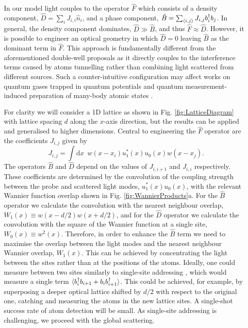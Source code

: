 In our model light couples to the operator $\hat{F}$ which consists of
a density component, $\hat{D} = \sum_i J_{i,i} \hat{n}_i$, and a phase
component, $\hat{B} = \sum_{\langle i, j \rangle} J_{i,j} b^\dagger_i
b_j$. In general, the density component dominates,
$\hat{D} \gg \hat{B}$, and thus $\hat{F} \approx \hat{D}$.  However,
it is possible to engineer an optical geometry in which $\hat{D} = 0$
leaving $\hat{B}$ as the dominant term in $\hat{F}$. This approach is
fundamentally different from the aforementioned double-well proposals
as it directly couples to the interference terms caused by atoms
tunnelling rather than combining light scattered from different
sources. Such a counter-intuitive configuration may affect works on
quantum gases trapped in quantum potentials \cite{mekhov2012,
  mekhov2008, larson2008, chen2009, habibian2013, ivanov2014,
  caballero2015} and quantum measurement-induced preparation of
many-body atomic states \cite{mazzucchi2016, mekhov2009prl,
  pedersen2014, elliott2015}.


For clarity we will consider a 1D lattice as shown in
Fig. \ref{fig:LatticeDiagram} with lattice spacing $d$ along the
$x$-axis direction, but the results can be applied and generalised to
higher dimensions. Central to engineering the $\hat{F}$ operator are
the coefficients $J_{i,j}$ given by
\begin{equation}
  \label{eq:Jcoeff}
  J_{i,j} = \int \mathrm{d} x \,\,\, w(x - x_i) u_1^*(x) u_0(x) w(x - x_j).
\end{equation}
The operators $\hat{B}$ and $\hat{D}$ depend on the values of
$J_{i,i+1}$ and $J_{i,i}$ respectively. These coefficients are
determined by the convolution of the coupling strength between the
probe and scattered light modes, $u_1^*(x)u_0(x)$, with the relevant
Wannier function overlap shown in Fig. \ref{fig:WannierProducts}a. For
the $\hat{B}$ operator we calculate the convolution with the nearest
neighbour overlap, $W_1(x) \equiv w(x - d/2) w(x + d/2)$, and for the
$\hat{D}$ operator we calculate the convolution with the square of the
Wannier function at a single site, $W_0(x) \equiv w^2(x)$. Therefore,
in order to enhance the $\hat{B}$ term we need to maximise the overlap
between the light modes and the nearest neighbour Wannier overlap,
$W_1(x)$. This can be achieved by concentrating the light between the
sites rather than at the positions of the atoms. Ideally, one could
measure between two sites similarly to single-site addressing
\cite{greiner2009, bloch2011}, which would measure a single term
$\langle b^\dagger_i b_{i+1}+b_i b^\dagger_{i+1}\rangle$. This could be achieved,
for example, by superposing a deeper optical lattice shifted by $d/2$
with respect to the original one, catching and measuring the atoms in
the new lattice sites. A single-shot success rate of atom detection
will be small. As single-site addressing is challenging, we proceed
with the global scattering.

